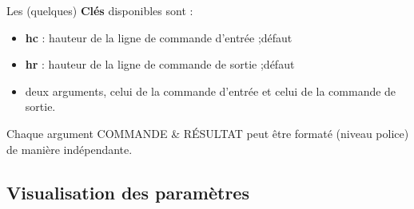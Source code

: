 \documentclass{article}
\newcommand\Cle[1]{{\bfseries\sffamily\textlangle #1\textrangle}}
\begin{document}
\begin{codetex}
\end{codetex}

\begin{codecles}
Les (quelques) \Cle{Clés} disponibles sont :

\begin{itemize}
	\item \Cle{hc} : hauteur de la ligne de commande d'entrée ;\hfill{}défaut \Cle{0.75}
	\item \Cle{hr} : hauteur de la ligne de commande de sortie ;\hfill{}défaut \Cle{0.75}
	\item deux \textsf{arguments}, celui de la commande d'entrée et celui de la commande de sortie.
\end{itemize}
%
Chaque argument \textsf{COMMANDE} \& \textsf{RÉSULTAT} peut être formaté (niveau police) de manière indépendante.
\end{codecles}

\begin{codetex}
\paramCF[titre=true,couleurcmd=olive,couleurres=orange]
\end{codetex}

\subsection{Visualisation des paramètres}
\end{document}
